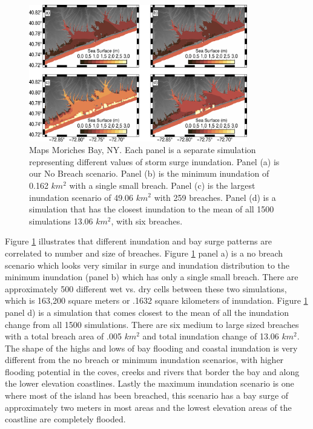 \documentclass{coastal_paper}
\begin{document}
\begin{figure}
    \centering
    \includegraphics[width=0.85\textwidth]{figures/fig6_v2.pdf}

    \caption{Maps Moriches Bay, NY. Each panel is a separate simulation representing different values of storm surge inundation. Panel (a) is our No Breach scenario. Panel (b) is the minimum inundation of 0.162 $km^2$ with a single small breach. Panel (c) is the largest inundation scenario of 49.06 $km^2$ with 259 breaches. Panel (d)  is a simulation that has the closest inundation to the mean of all 1500 simulations 13.06 $km^2$, with six breaches.}
    \label{fig:6}
\end{figure}

Figure \ref{fig:6} illustrates that different inundation and bay surge patterns are correlated to number and size of breaches. Figure \ref{fig:6} panel a) is a no breach scenario which looks very similar in surge and inundation distribution to the minimum inundation (panel b) which has only a single small breach. There are approximately 500 different wet vs. dry cells between these two simulations, which is 163,200 square meters or .1632 square kilometers of inundation. Figure \ref{fig:6} panel d) is a simulation that comes closest to the mean of all the inundation change from all 1500 simulations. There are six medium to large sized breaches with a total breach area of .005 $km^2$ and total inundation change of 13.06 $km^2$. The shape of the highs and lows of bay flooding and coastal inundation is very different from the no breach or minimum inundation scenarios, with higher flooding potential in the coves, creeks and rivers that border the bay and along the lower elevation coastlines. Lastly the maximum inundation scenario is one where most of the island has been breached, this scenario has a bay surge of approximately two meters in most areas and the lowest elevation areas of the coastline are completely flooded.
\end{document}
